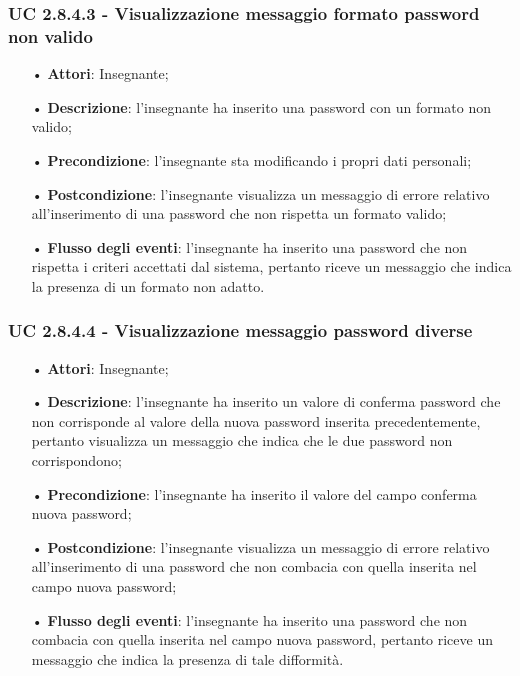 \subsubsection{UC 2.8.4.3 - Visualizzazione messaggio formato password non valido}
\begin{itemize}
	\item[•]\textbf{Attori}: Insegnante;
	\item[•]\textbf{Descrizione}: l'insegnante ha inserito una password con un formato non valido;
	\item[•]\textbf{Precondizione}: l'insegnante sta modificando i propri dati personali;
	\item[•]\textbf{Postcondizione}: l'insegnante visualizza un messaggio di errore relativo all'inserimento di una password che non rispetta un formato valido; 
	\item[•]\textbf{Flusso degli eventi}: l'insegnante ha inserito una password che non rispetta i criteri accettati dal sistema, pertanto riceve un messaggio che indica la presenza di un formato non adatto.
\end{itemize}

\subsubsection{UC 2.8.4.4 - Visualizzazione messaggio password diverse}
\begin{itemize}
	\item[•]\textbf{Attori}: Insegnante;
	\item[•]\textbf{Descrizione}: l'insegnante ha inserito un valore di conferma password che non corrisponde al valore della nuova password inserita precedentemente, pertanto visualizza un messaggio che indica che le due password non corrispondono;
	\item[•]\textbf{Precondizione}: l'insegnante ha inserito il valore del campo conferma nuova password;
	\item[•]\textbf{Postcondizione}: l'insegnante visualizza un messaggio di errore relativo all'inserimento di una password che non combacia con quella inserita nel campo nuova password; 
	\item[•]\textbf{Flusso degli eventi}: l'insegnante ha inserito una password che non combacia con quella inserita nel campo nuova password, pertanto riceve un messaggio che indica la presenza di tale difformità.
\end{itemize}
	
	

